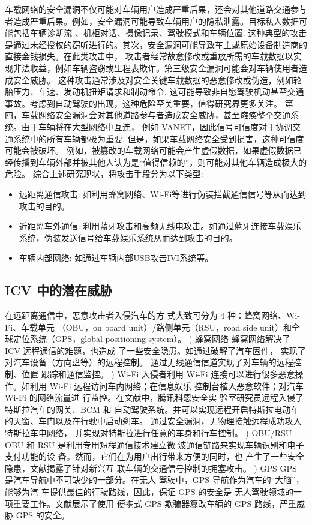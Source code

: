 车载网络的安全漏洞不仅可能对车辆用户造成严重后果，还会对其他道路交通参与者造成严重后果。例如，安全漏洞可能导致车辆用户的隐私泄露。目标私人数据可能包括车辆诊断流
、机柜对话、摄像记录、驾驶模式和车辆位置\cite{amoozadeh2015security}. 
这种典型的攻击是通过未经授权的窃听进行的。其次，安全漏洞可能导致车主或原始设备制造商的直接金钱损失。在此类攻击中，
攻击者经常故意修改或重放所需的车载数据以实现非法收益，例如车辆盗窃或里程表欺诈。第三级安全漏洞可能会对车辆使用者造成安全威胁。
这种攻击通常涉及对安全关键车载数据的恶意修改或伪造，例如轮胎压力、车速、发动机扭矩请求和制动命令. 
这可能导致非自愿驾驶机动甚至交通事故。考虑到自动驾驶的出现，这种危险至关重要，值得研究界更多关注。
第四，车载网络安全漏洞会对其他道路参与者造成安全威胁，甚至瘫痪整个交通系统。由于车辆将在大型网络中互连，
例如 VANET，因此信号可信度对于协调交通系统中的所有车辆都极为重要\cite{harding2014vehicle}.
 但是，如果车载网络安全受到损害，这种可信度可能会被破坏。
 例如，被篡改的车载网络可能会产生虚假数据，如果虚假数据已经传播到车辆外部并被其他人认为是“值得信赖的”，则可能对其他车辆造成极大的危险。
综合上述研究现状，将攻击手段分为以下类型:
\begin{itemize}
    \item 远距离通信攻击: 如利用蜂窝网络、Wi-Fi等进行伪装拦截通信信号等从而达到攻击的目的。
    \item 近距离车外通信: 利用蓝牙攻击和高频无线电攻击。如通过蓝牙连接车载娱乐系统，伪装发送信号给车载娱乐系统从而达到攻击的目的。
    \item 车辆内部网络: 如通过车辆内部USB攻击IVI系统等。
\end{itemize}

\subsection{ICV 中的潜在威胁}
在远距离通信中，恶意攻击者入侵汽车的方
式大致可分为 4 种：蜂窝网络、Wi-Fi、车载单元
（OBU，on board unit）/路侧单元（RSU，road side
unit）和全球定位系统（GPS，global positioning
system）。
) 蜂窝网络
蜂窝网络解决了 ICV 远程通信的难题，也造成
了一些安全隐患。如通过破解了汽车固件，
实现了对汽车设备（方向盘等）的远程控制。
通过无线通信信道实现了对车辆的远程控制、位置
跟踪和通信监控。
) Wi-Fi
入侵者利用 Wi-Fi 连接可以进行很多恶意操
作。如利用 Wi-Fi 远程访问车内网络；在信息娱乐
控制台植入恶意软件；对汽车 Wi-Fi 的网络流量进
行监控。在文献\cite{keen}中，腾讯科恩安全实
验室研究员远程入侵了特斯拉汽车的网关、BCM 和
自动驾驶系统。并可以实现远程开启特斯拉电动车的天窗、车门以及在行驶中启动刹车。
通过安全漏洞，无物理接触远程成功攻入特斯拉车电网络，
并实现对特斯拉进行任意的车身和行车控制。
) OBU/RSU
OBU 和 RSU 是利用专用短程通信技术建立微
波通信链路来实现车辆识别和电子支付功能的设
备。然而，它们在为用户出行带来方便的同时，也
产生了一些安全隐患，文献\cite{yongsai}揭露了针对新兴互
联车辆的交通信号控制的拥塞攻击。
) GPS
GPS 是汽车导航中不可缺少的一部分。在无人
驾驶中，GPS 导航作为汽车的“大脑”，能够为汽
车提供最佳的行驶路线，因此，保证 GPS 的安全是
无人驾驶领域的一项重要工作。文献\cite{cuigai}展示了使用
便携式 GPS 欺骗器篡改车辆的 GPS 路线，严重威
胁 GPS 的安全。
